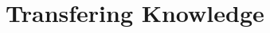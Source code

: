 \documentclass[10pt,twocolumn,letterpaper]{article}
\begin{document}
\section{Transfering Knowledge}



% 





{\small


}
\end{document}
